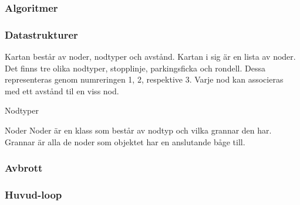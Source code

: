 \documentclass[designspec/spec.tex]{subfiles}
\begin{document}
\subsubsection{Algoritmer}

\subsubsection{Datastrukturer}
Kartan består av noder, nodtyper och avstånd. Kartan i sig är en lista av
noder. Det finns tre olika nodtyper, stopplinje, parkingsficka och rondell.
Dessa representeras genom numreringen 1, 2, respektive 3. Varje nod kan
associeras med ett avstånd til en viss nod.  

\begin{labeling}{Nodtyper}

\item [Noder] 
Noder är en klass som består av nodtyp och vilka grannar den har. Grannar är
alla de noder som objektet har en anslutande båge till.

\end{labeling}

\subsubsection{Avbrott}

\subsubsection{Huvud-loop}
\end{document}
